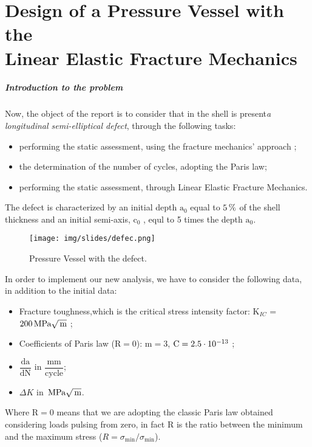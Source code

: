 \documentclass[a4paper,12pt]{article}
\begin{document}
\section{Design of a Pressure Vessel with the \\ Linear Elastic Fracture Mechanics}

\subparagraph*{Introduction to the problem\\}
Now, the object of the report is to consider that in the shell is present\emph{a longitudinal semi-elliptical defect}, through the following tasks:

\begin{itemize}
\item performing the static assessment, using the fracture mechanics' approach ;
\item the determination of the number of cycles, adopting the Paris law;
\item performing the static assessment, through Linear Elastic Fracture Mechanics.\\
\end{itemize}  

The defect is characterized by an initial depth $ \text{a}_0 $ equal to $5\,\%$ of the shell thickness and an initial semi-axis, $ \text{c}_0$ , equl to 5 times the depth $\text{a}_0$. 
\begin{figure}[H]
\centering
\texttt{[image: img/slides/defec.png]}
\caption{Pressure Vessel with the defect.}
\end{figure}
In order to implement our new analysis, we have to consider the following data, in addition to the initial data:

\begin{itemize}
\item Fracture toughness,which is the critical stress intensity factor: $\text{K}_{IC}$ = $200 \,\text{MPa} \sqrt{\,\text{m}}$ ;
\item Coefficients of Paris law ($\text{R}=0$): $\text{m}=3$, $\text{C}=2.5\cdot 10^{-13}$ ;
\item $\dfrac{\text{da}}{\text{dN}}$ in $\dfrac{\text{mm}}{\text{cycle}}$; 

\item $\Delta K$ in $\,\text{MPa} \sqrt{\,\text{m}}$.
\end{itemize}

Where $\text{R}=0$ means that we are adopting the classic Paris law obtained considering loads pulsing from zero, in fact $\text{R}$ is the ratio between the minimum and the maximum stress ($R = \sigma_\text{min} / \sigma_\text{min}$).
\end{document}

